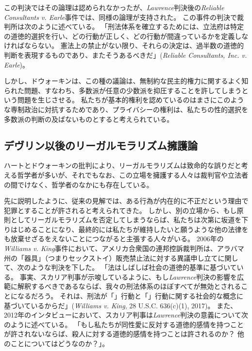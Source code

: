 \documentclass[paper=a4,book,openany]{jlreq}
\newcommand{\ig}[1]{}           %
\begin{document}
この判決ではその論理は認められなかったが、\emph{Lawrence}判決後の\emph{Reliable Consultants v. Earle}事件では、同様の論理が支持された。
この事件の判決で裁判所は次のように述べている。
「刑法体系を確立するためには、立法府は特定の道徳的選択を行い、どの行動が正しく、どの行動が間違っているかを定義しなければならない。
憲法上の禁止がない限り、それらの決定は、過半数の道徳的判断を表現するものであり、またそうあるべきだ」(\emph{Reliable Consultants, Inc. v. Earle}\ig{, 517 F.3d 738, 2008})。

しかし、ドウォーキン\ig{Ronald Dworkin}は、この種の議論は、無制約な民主的権力に関するよく知られた問題、すなわち、多数派が任意の少数派を抑圧することを許してしまうという問題を生じさせる。
私たちが基本的権利を認めているのはまさにこのような専制政治に対抗するためであり、プライバシーの権利は、私たちの性的選択を多数派の判断の及ばないものとすると考えられている。

\subsection{デヴリン以後のリーガルモラリズム擁護論}

ハートとドウォーキン\ig{Ronald Dworkin}の批判により、リーガルモラリズムは致命的な誤りだと考える哲学者が多いが、それでもなお、この立場を擁護する人々は裁判官や立法者の間でけなく、哲学者のなかにも存在している。

先に説明したように、従来の見解では、ある行為が内在的に不正だという理由で犯罪とすることが許されると考えられてきた。
しかし、別の立場から、もし原則としてリーガルモラリズムを否定してしまうならば、私たちは次第に坂道を下りはじめることになり、最終的には私たちが維持したいと願うような他の法律をも放棄せざるをえないことにつながると主張する人々がいる。
2006年の\emph{Williams v. King}事件において、アメリカ合衆国の連邦控訴裁判所は、アラバマ州の「器具」（つまりセックストイ）販売禁止法に対する異議申し立てに関して、次のような判決を下した。
「法はしばしば社会の道徳的基準に基づいている。
事実、スカリア判事が示唆しているように、もし\emph{Lawrence}判決の影響を広範に解釈するべきであるならば、我々の刑法体系のほぼすべてが無効とされることになるだろう。
それは、刑法が「」行動と「」行動に関する社会的な概念に基づいているからだ」(\emph{Williams v. King}, 28 U.S.C. 636(c)(1), 2017)。
また、2012年のインタビューにおいて、スカリア判事は\emph{Lawrence}判決の意義について次のように述べている。
「もし私たちが同性愛に反対する道徳的感情を持つことが許されないならば、殺人に対する道徳的感情を持つことは許されるのか？ 他のことについてはどうなのか？」\citep{sink12:_justic_scalia_defen_compar_laws_homos_murder}。
\end{document}
